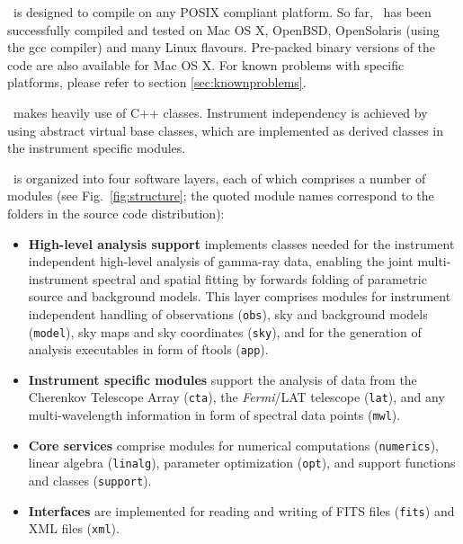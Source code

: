 \documentclass{article}[12pt,a4]
\begin{document}
\this\ is designed to compile on any POSIX compliant platform.
So far, \this\ has been successfully compiled and tested on Mac OS X, OpenBSD,
OpenSolaris (using the gcc compiler) and many Linux flavours.
Pre-packed binary versions of the code are also available for Mac OS X.
For known problems with specific platforms, please refer to 
section \ref{sec:knownproblems}.

\this\ makes heavily use of C++ classes.
Instrument independency is achieved by using abstract virtual base classes, which are
implemented as derived classes in the instrument specific modules.

\this\ is organized into four software layers, each of which comprises a number of modules
(see Fig.~\ref{fig:structure}; the quoted module names correspond to the folders in the
source code distribution):
\begin{itemize}
\item {\bf High-level analysis support} implements classes needed for the instrument 
independent high-level analysis of gamma-ray data, enabling the joint multi-instrument 
spectral and spatial fitting by forwards folding of parametric source and background models.
This layer comprises modules for 
instrument independent handling of observations ({\tt obs}), 
sky and background models ({\tt model}), 
sky maps and sky coordinates ({\tt sky}), 
and for the generation of analysis executables in form of ftools ({\tt app}).
%
\item {\bf Instrument specific modules} support the analysis of data from
the Cherenkov Telescope Array ({\tt cta}), 
the {\em Fermi}/LAT telescope ({\tt lat}), 
and any multi-wavelength information in form of spectral data points ({\tt mwl}).
%
\item {\bf Core services} comprise modules for 
numerical computations ({\tt numerics}),
linear algebra ({\tt linalg}), 
parameter optimization ({\tt opt}), 
and support functions and classes ({\tt support}).
%
\item {\bf Interfaces} are implemented for reading and writing of 
FITS files ({\tt fits}) 
and XML files ({\tt xml}).
\end{itemize}

\begin{figure*}[!t]
 \center
 \caption{Organisation of \this\ into software layers and modules.}
 \label{fig:structure}
\end{figure*}
\end{document}
